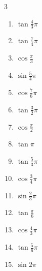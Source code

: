 \begin{multicols}{3}
\begin{enumerate}
  \item $\displaystyle \tan{\frac{4}{3}\pi}$

  \item $\displaystyle \tan{\frac{7}{4}\pi}$
        \phantom{$\displaystyle =-1$}

  \item $\displaystyle \cos{\frac{\pi}{3}}$

  \item $\displaystyle \sin{\frac{5}{4}\pi}$

  \item $\displaystyle \cos{\frac{7}{6}\pi}$

  \item $\displaystyle \tan{\frac{3}{2}\pi}$
        \phantom{$\displaystyle \quad なし$}

  \item $\displaystyle \cos{\frac{\pi}{2}}$
        \phantom{$\displaystyle =0$}

  \item $\displaystyle \tan{\pi}$
        \phantom{$\displaystyle =0$}

  \item $\displaystyle \tan{\frac{5}{3}\pi}$

  \item $\displaystyle \cos{\frac{3}{4}\pi}$

  \item $\displaystyle \sin{\frac{2}{3}\pi}$

  \item $\displaystyle \tan{\frac{\pi}{6}}$

  \item $\displaystyle \cos{\frac{4}{3}\pi}$

  \item $\displaystyle \tan{\frac{5}{6}\pi}$

  \item $\displaystyle \sin{2\pi}$
        \phantom{$\displaystyle =0$}

\columnbreak %


\end{enumerate}
\end{multicols}
